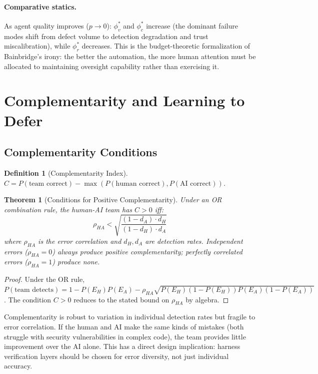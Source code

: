 \documentclass[11pt, a4paper, copyright]{googledeepmind}
\newtheorem{definition}{Definition}[section]
\newtheorem{theorem}{Theorem}[section]
\begin{document}
\paragraph{Comparative statics.} As agent quality improves ($p \to 0$): $\phi_v^*$ and $\phi_c^*$ increase (the dominant failure modes shift from defect volume to detection degradation and trust miscalibration), while $\phi_r^*$ decreases. This is the budget-theoretic formalization of Bainbridge's irony: the better the automation, the more human attention must be allocated to maintaining oversight capability rather than exercising it.

\section{Complementarity and Learning to Defer}
\label{sec:complementarity}

\subsection{Complementarity Conditions}

\begin{definition}[Complementarity Index]
$C = P(\text{team correct}) - \max(P(\text{human correct}), P(\text{AI correct}))$.
\end{definition}

\begin{theorem}[Conditions for Positive Complementarity]
\label{thm:complementarity}
Under an OR combination rule, the human-AI team has $C > 0$ iff:
\begin{equation}
\rho_{HA} < \sqrt{\frac{(1 - d_A) \cdot d_H}{(1 - d_H) \cdot d_A}}
\end{equation}
where $\rho_{HA}$ is the error correlation and $d_H, d_A$ are detection rates. Independent errors ($\rho_{HA} = 0$) always produce positive complementarity; perfectly correlated errors ($\rho_{HA} = 1$) produce none.
\end{theorem}

\begin{proof}
Under the OR rule, $P(\text{team detects}) = 1 - P(E_H)P(E_A) - \rho_{HA}\sqrt{P(E_H)(1-P(E_H))P(E_A)(1-P(E_A))}$. The condition $C > 0$ reduces to the stated bound on $\rho_{HA}$ by algebra.
\end{proof}

Complementarity is robust to variation in individual detection rates but fragile to error correlation. If the human and AI make the same kinds of mistakes (both struggle with security vulnerabilities in complex code), the team provides little improvement over the AI alone. This has a direct design implication: harness verification layers should be chosen for error diversity, not just individual accuracy.
\end{document}
